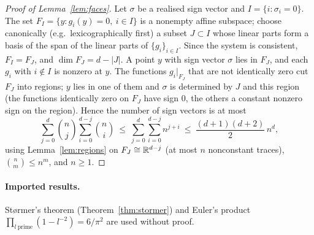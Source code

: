 \begin{proof}[Proof of Lemma~\ref{lem:faces}]
Let $\sigma$ be a realised sign vector and $I=\{i:\sigma_i=0\}$. The set $F_I=\{y:g_i(y)=0,\ i\in I\}$ is a nonempty affine subspace; choose canonically (e.g.\ lexicographically first) a subset $J\subset I$ whose linear parts form a basis of the span of the linear parts of $\{g_i\}_{i\in I}$. Since the system is consistent, $F_I=F_J$, and $\dim F_J=d-|J|$. A point $y$ with sign vector $\sigma$ lies in $F_J$, and each $g_i$ with $i\notin I$ is nonzero at $y$. The functions $g_i|_{F_J}$ that are not identically zero cut $F_J$ into regions; $y$ lies in one of them and $\sigma$ is determined by $J$ and this region (the functions identically zero on $F_J$ have sign $0$, the others a constant nonzero sign on the region). Hence the number of sign vectors is at most
\[
\sum_{j=0}^{d}\binom nj\sum_{i=0}^{d-j}\binom ni\ \le\ \sum_{j=0}^{d}\sum_{i=0}^{d-j}n^{j+i}\ \le\ \frac{(d+1)(d+2)}2\,n^d,
\]
using Lemma~\ref{lem:regions} on $F_J\cong\mathbb{R}^{d-j}$ (at most $n$ nonconstant traces), $\binom nm\le n^m$, and $n\ge1$. \end{proof}

\paragraph{Imported results.} Størmer's theorem (Theorem~\ref{thm:stormer}) and Euler's product $\prod_{l\ \mathrm{prime}}(1-l^{-2})=6/\pi^2$ are used without proof.

